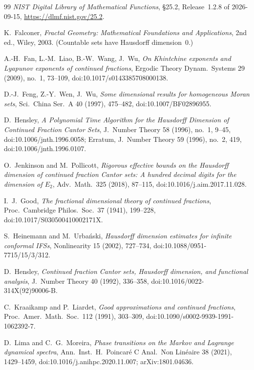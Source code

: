 \documentclass[11pt]{article}
\theoremstyle{definition}
\theoremstyle{remark}
\begin{document}
\begin{thebibliography}{99}
 \emph{NIST Digital Library of Mathematical Functions}, \S25.2,
Release~1.2.8 of 2026-09-15, \url{https://dlmf.nist.gov/25.2}.

 K.~Falconer, \emph{Fractal Geometry: Mathematical
Foundations and Applications}, 2nd ed., Wiley, 2003. (Countable sets have
Hausdorff dimension~$0$.)

 A.-H.~Fan, L.-M.~Liao, B.-W.~Wang, J.~Wu, \emph{On Khintchine
exponents and Lyapunov exponents of continued fractions}, Ergodic Theory Dynam.\ Systems 29 (2009), no.~1, 73--109, doi:10.1017/s0143385708000138.

 D.-J.~Feng, Z.-Y.~Wen, J.~Wu, \emph{Some dimensional results
for homogeneous Moran sets}, Sci.\ China Ser.\ A 40 (1997), 475--482,
doi:10.1007/BF02896955.

 D.~Hensley, \emph{A Polynomial Time Algorithm for the
Hausdorff Dimension of Continued Fraction Cantor Sets}, J.\ Number Theory 58 (1996),
no.~1, 9--45, doi:10.1006/jnth.1996.0058; Erratum, J.\ Number Theory 59 (1996),
no.~2, 419, doi:10.1006/jnth.1996.0107.

 O.~Jenkinson and M.~Pollicott, \emph{Rigorous effective bounds
on the Hausdorff dimension of continued fraction Cantor sets: A hundred decimal digits
for the dimension of $E_2$}, Adv.\ Math.\ 325 (2018), 87--115,
doi:10.1016/j.aim.2017.11.028.

{\sloppy
{} I.~J.~Good, \emph{The fractional dimensional theory of continued
fractions}, Proc.\ Cambridge Philos.\ Soc.\ 37 (1941), 199--228,
doi:10.1017/S030500410002171X.
}

{\sloppy
{} S.~Heinemann and M.~Urba\'nski, \emph{Hausdorff dimension estimates
for infinite conformal IFSs}, Nonlinearity 15 (2002), 727--734,
doi:10.1088/0951-7715/15/3/312.
}

{\sloppy
{} D.~Hensley, \emph{Continued fraction Cantor sets, Hausdorff
dimension, and functional analysis}, J.\ Number Theory 40 (1992), 336--358,
doi:10.1016/0022-314X(92)90006-B.
}

 C.~Kraaikamp and P.~Liardet, \emph{Good approximations and
continued fractions}, Proc.\ Amer.\ Math.\ Soc.\ 112 (1991), 303--309, doi:10.1090/s0002-9939-1991-1062392-7.

 D.~Lima and C.~G.~Moreira, \emph{Phase transitions on
the Markov and Lagrange dynamical spectra}, Ann.\ Inst.\ H.~Poincar\'e
C Anal.\ Non Lin\'eaire 38 (2021), 1429--1459,
doi:10.1016/j.anihpc.2020.11.007; arXiv:1801.04636.


\end{thebibliography}
\end{document}

